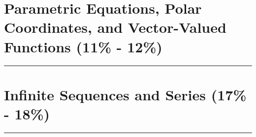 \documentclass[12pt]{article}
\newcommand{\fline}{\par\noindent\rule{\textwidth}{0.1pt}} %
\begin{document}
    \section{Parametric Equations, Polar Coordinates, and Vector-Valued Functions (11\% - 12\%)}
    \fline

    \section{Infinite Sequences and Series (17\% - 18\%)}
    \fline
\end{document}
